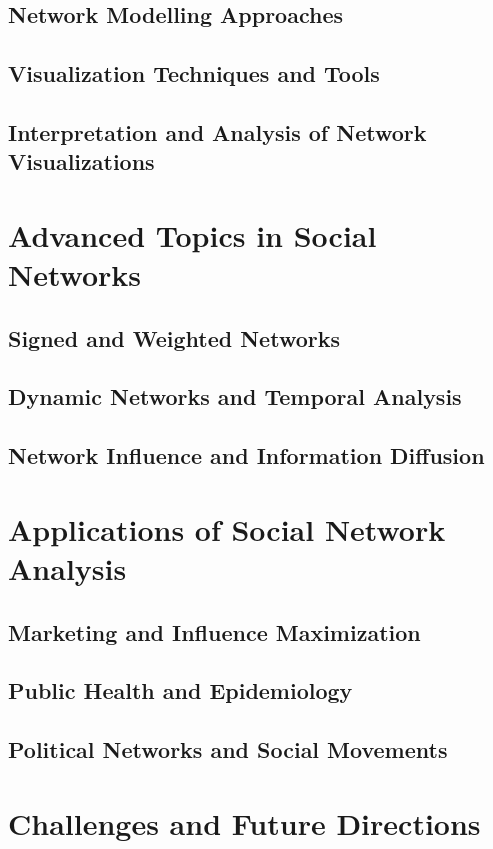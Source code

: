\documentclass[12pt]{book} %
\begin{document}
\subsection{Network Modelling Approaches}
\subsection{Visualization Techniques and Tools}
\subsection{Interpretation and Analysis of Network Visualizations}

\section{Advanced Topics in Social Networks}
\subsection{Signed and Weighted Networks}
\subsection{Dynamic Networks and Temporal Analysis}
\subsection{Network Influence and Information Diffusion}

\section{Applications of Social Network Analysis}
\subsection{Marketing and Influence Maximization}
\subsection{Public Health and Epidemiology}
\subsection{Political Networks and Social Movements}

\section{Challenges and Future Directions}
\end{document}
